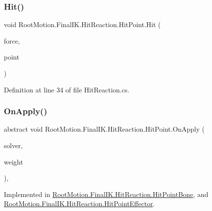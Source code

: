 \subsubsection{\texorpdfstring{Hit()}{Hit()}}
{\footnotesize\ttfamily void Root\+Motion.\+Final\+I\+K.\+Hit\+Reaction.\+Hit\+Point.\+Hit (\begin{DoxyParamCaption}\item[{Vector3}]{force,  }\item[{Vector3}]{point }\end{DoxyParamCaption})}



Definition at line 34 of file Hit\+Reaction.\+cs.

\mbox{\label{class_root_motion_1_1_final_i_k_1_1_hit_reaction_1_1_hit_point_a7d63612de19053ba0ac4f5e4094cc1b7}} 
\subsubsection{\texorpdfstring{On\+Apply()}{OnApply()}}
{\footnotesize\ttfamily abstract void Root\+Motion.\+Final\+I\+K.\+Hit\+Reaction.\+Hit\+Point.\+On\+Apply (\begin{DoxyParamCaption}\item[{\mbox{\hyperlink{class_root_motion_1_1_final_i_k_1_1_i_k_solver_full_body_biped}{I\+K\+Solver\+Full\+Body\+Biped}}}]{solver,  }\item[{float}]{weight }\end{DoxyParamCaption})\hspace{0.3cm}{\ttfamily [protected]}, {}}



Implemented in \mbox{\hyperlink{class_root_motion_1_1_final_i_k_1_1_hit_reaction_1_1_hit_point_bone_a4a966ad4690bc493d1caa9abbb036724}{Root\+Motion.\+Final\+I\+K.\+Hit\+Reaction.\+Hit\+Point\+Bone}}, and \mbox{\hyperlink{class_root_motion_1_1_final_i_k_1_1_hit_reaction_1_1_hit_point_effector_a165bed844ab2e9154ea402b8d6029c43}{Root\+Motion.\+Final\+I\+K.\+Hit\+Reaction.\+Hit\+Point\+Effector}}.



